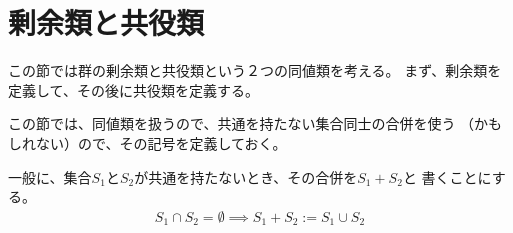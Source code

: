 \begingroup %
	\newcommand{\Hom}{\ensuremath{\myop{Hom}}}
	\newcommand{\End}{\ensuremath{\myop{End}}}
	\newcommand{\Auto}{\ensuremath{\myop{Auto}}}
	\newcommand{\onto}{\ensuremath{\myop{onto}}}

\section{剰余類と共役類}\label{s1:剰余類と共役類} %
	この節では群の剰余類と共役類という２つの同値類を考える。
	まず、剰余類を定義して、その後に共役類を定義する。

	この節では、同値類を扱うので、共通を持たない集合同士の合併を使う
	（かもしれない）ので、その記号を定義しておく。

	\begin{definition}
	\label{def:共通を持たない集合の合併} %
		一般に、集合$S_1$と$S_2$が共通を持たないとき、その合併を$S_1+S_2$と
		書くことにする。
		\begin{equation*}\begin{split} %
			S_1\cap S_2 = \emptyset \implies S_1 + S_2 := S_1 \cup S_2
		\end{split}\end{equation*} %
	\end{definition} %


